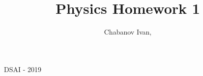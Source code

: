 

\begin{titlepage}
    \title{Physics Homework 1}
    \author{Chabanov Ivan, }
    \maketitle
    DSAI - 2019


\end{titlepage}